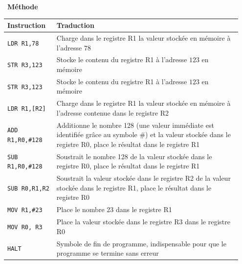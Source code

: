 \documentclass[a4paper, french, 11pt]{article}  %
\newcounter{prog}
\newenvironment{methode}[1]
{\par \medskip    \noindent  
 \begin {bclogo}[arrondi =0.1,logo=\bcoutil, marge=4,noborder = true] {~\textbf{Méthode}   {\itshape #1} }  \par}
{
\end{bclogo}
 \par \bigskip }
\begin{document}
\begin{methode}{}
\begin{center}
\begin{tabular}{|p{0.2\linewidth}|p{0.75\linewidth}|}
\hline 
\textbf{Instruction} & \textbf{Traduction} \\ 
\hline 
\texttt{LDR R1,78} & Charge dans le registre R1 la valeur stockée en mémoire à l'adresse $78$ \\ 
\hline 
\texttt{STR R3,123} & Stocke le contenu du registre R1 à l'adresse $123$ en mémoire \\ 
\hline
\texttt{STR R3,123} & Stocke le contenu du registre R1 à l'adresse $123$ en mémoire \\ 
\hline
\texttt{LDR R1,[R2]} & Charge dans le registre R1 la valeur stockée en mémoire à l'adresse contenue dans le registre R2 \\ 
\hline 
\texttt{ADD R1,R0,\#128} & Additionne le nombre 128 (une valeur immédiate est identifiée grâce au symbole \#) et la valeur stockée dans le registre R0, place
le résultat dans le registre R1 \\ 
\hline 
\texttt{SUB R1,R0,\#128} & Soustrait le nombre 128 de la valeur stockée dans le registre R0, place le résultat dans le registre R1 \\ 
\hline 
\texttt{SUB R0,R1,R2} & Soustrait la valeur stockée dans le registre R2 de la valeur stockée dans le registre R1, place le résultat dans le registre R0 \\ 
\hline 
\texttt{MOV R1,\#23} & Place le nombre 23 dans le registre R1 \\ 
\hline 
\texttt{MOV R0, R3} & Place la valeur stockée dans le registre R3 dans le registre R0 \\ 
\hline 
\texttt{HALT} & Symbole de fin de programme, indispensable pour que le programme se termine sans erreur \\ 
\hline
\end{tabular} 
\end{center}


\end{methode}
\end{document}
